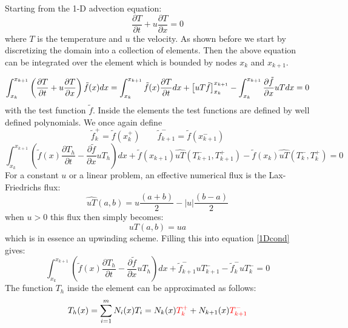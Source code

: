 Starting from the 1-D advection equation:
\begin{equation}
    \frac{\partial T}{\partial t}+u\frac{\partial T}{\partial x}=0 
\end{equation}
where $T$ is the temperature and $u$ the velocity. 
As shown before we start by discretizing the domain into a collection of elements. Then the above equation can be integrated over the element which is bounded by nodes $x_k$ and $x_{k+1}$. 

\begin{equation}
\int_{x_k}^{x_{k+1}}  \left(\frac{\partial T}{\partial t}+u\frac{\partial T}{\partial x}\right) \tilde{f}(x) dx 
=
\int_{x_k}^{x_{k+1}} \tilde{f}(x)\frac{\partial T}{\partial t} dx
+\left[ uT \tilde{f}  \right]_{x_k}^{x_{k+1}}
-\int_{x_k}^{x_{k+1}} \frac{\partial \tilde{f}}{\partial x} uT dx
=0 \nonumber
\end{equation}
with the test function $\tilde{f}$. 
Inside the elements the test functions are defined by well defined polynomials. 
We once again define
\[
\tilde{f}_k^+=\tilde{f}(x_k^+)
\qquad
\tilde{f}_{k+1}^-=\tilde{f}(x_{k+1}^-)
\]
\begin{equation}
    \int_{x_k}^{x_{k+1}}\left(
    \tilde{f}(x)\frac{\partial T_h}{\partial t}-
    \frac{\partial \tilde{f}}{\partial x} uT_h \right) dx
    +\tilde{f}(x_{k+1})\widehat{uT}(T_{k+1}^-,T_{k+1}^+)
    -\tilde{f}(x_{k})\widehat{uT}(T_{k}^-,T_{k}^+)=0
    \label{1Dcond}
\end{equation}
For a constant $u$ or a linear problem, an effective numerical flux
is the Lax-Friedrichs flux:
\begin{equation}
\widehat{uT}(a,b)=u \frac{(a+b)}{2}-|u|\frac{(b-a)}{2}
\end{equation}
when $u>0$ this flux then simply becomes:
\begin{equation}
uT(a,b)=u a
\end{equation}
which is in essence an upwinding scheme.
Filling this into equation \ref{1Dcond} gives:
\begin{equation}
\int_{x_k}^{x_{k+1}}\left(
\tilde{f}(x)\frac{\partial T_h}{\partial t}-
\frac{\partial \tilde{f}}{\partial x} uT_h \right) dx
+\tilde{f}_{k+1}^-uT_{k+1}^-     -\tilde{f}_{k}^-uT_{k}^-=0
\end{equation}
The function $T_h$ inside the element can be approximated 
as follows:
\begin{equation}
T_h(x) = \sum_{i=1}^m N_i(x) T_i = 
N_k(x) {\color{red}T_k^+} + N_{k+1}(x) {\color{red}T_{k+1}^-}
\label{eq:dgadv1} 
\end{equation}
